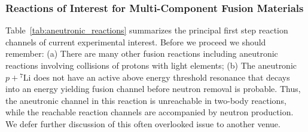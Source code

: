 \documentclass[particles,article,accept,pdftex,moreauthors]{Definitions/mdpi}
\begin{document}
\subsubsection{Reactions of Interest for Multi-Component Fusion Materials}
Table~\ref{tab:aneutronic_reactions} summarizes the principal first step reaction channels of current experimental interest. Before we proceed we should remember: (a) There are many other fusion reactions including aneutronic reactions involving collisions of protons with light elements; (b) The aneutronic $p + {}^{7}\mathrm{Li}$ does not have an active above energy threshold resonance that decays into an energy yielding fusion channel before neutron removal is probable. Thus, the aneutronic channel in this reaction is unreachable in two-body reactions, while the reachable reaction channels are accompanied by neutron production. We defer further discussion of this often overlooked issue to another venue.
\end{document}
